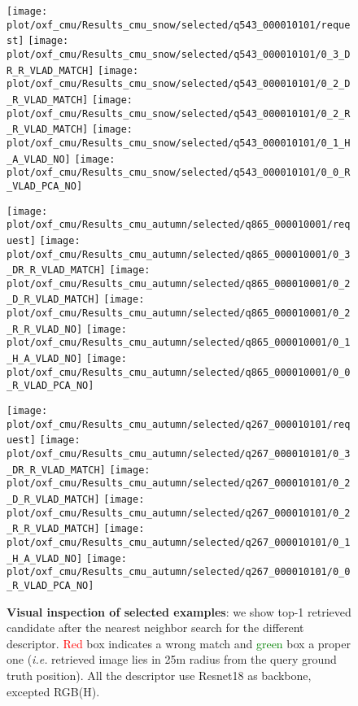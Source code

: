 \begin{figure*}
\begin{minipage}{0.95\textwidth}
		\texttt{[image: plot/oxf\_cmu/Results\_cmu\_snow/selected/q543\_000010101/request]}
		\texttt{[image: plot/oxf\_cmu/Results\_cmu\_snow/selected/q543\_000010101/0\_3\_DR\_R\_VLAD\_MATCH]}
		\texttt{[image: plot/oxf\_cmu/Results\_cmu\_snow/selected/q543\_000010101/0\_2\_D\_R\_VLAD\_MATCH]}
		\texttt{[image: plot/oxf\_cmu/Results\_cmu\_snow/selected/q543\_000010101/0\_2\_R\_R\_VLAD\_MATCH]}
		\texttt{[image: plot/oxf\_cmu/Results\_cmu\_snow/selected/q543\_000010101/0\_1\_H\_A\_VLAD\_NO]}
		\texttt{[image: plot/oxf\_cmu/Results\_cmu\_snow/selected/q543\_000010101/0\_0\_R\_VLAD\_PCA\_NO]}
	\end{minipage}
	
	\begin{minipage}{0.01\textwidth}
	\end{minipage}
	\begin{minipage}{0.95\textwidth}
		\center
		\texttt{[image: plot/oxf\_cmu/Results\_cmu\_autumn/selected/q865\_000010001/request]}
		\texttt{[image: plot/oxf\_cmu/Results\_cmu\_autumn/selected/q865\_000010001/0\_3\_DR\_R\_VLAD\_MATCH]}
		\texttt{[image: plot/oxf\_cmu/Results\_cmu\_autumn/selected/q865\_000010001/0\_2\_D\_R\_VLAD\_MATCH]}	
		\texttt{[image: plot/oxf\_cmu/Results\_cmu\_autumn/selected/q865\_000010001/0\_2\_R\_R\_VLAD\_NO]}	
		\texttt{[image: plot/oxf\_cmu/Results\_cmu\_autumn/selected/q865\_000010001/0\_1\_H\_A\_VLAD\_NO]}	
		\texttt{[image: plot/oxf\_cmu/Results\_cmu\_autumn/selected/q865\_000010001/0\_0\_R\_VLAD\_PCA\_NO]}
		
		\texttt{[image: plot/oxf\_cmu/Results\_cmu\_autumn/selected/q267\_000010101/request]}
		\texttt{[image: plot/oxf\_cmu/Results\_cmu\_autumn/selected/q267\_000010101/0\_3\_DR\_R\_VLAD\_MATCH]}
		\texttt{[image: plot/oxf\_cmu/Results\_cmu\_autumn/selected/q267\_000010101/0\_2\_D\_R\_VLAD\_MATCH]}
		\texttt{[image: plot/oxf\_cmu/Results\_cmu\_autumn/selected/q267\_000010101/0\_2\_R\_R\_VLAD\_MATCH]}
		\texttt{[image: plot/oxf\_cmu/Results\_cmu\_autumn/selected/q267\_000010101/0\_1\_H\_A\_VLAD\_NO]}
		\texttt{[image: plot/oxf\_cmu/Results\_cmu\_autumn/selected/q267\_000010101/0\_0\_R\_VLAD\_PCA\_NO]}
	\end{minipage}
	
	\caption{\label{fig:im_exs} \textbf{Visual inspection of selected examples}: we show top-1 retrieved candidate after the nearest neighbor search for the different descriptor. \textcolor{red}{Red} box indicates a wrong match and \textcolor{green}{green} box a proper one (\textit{i.e.} retrieved image lies in 25m radius from the query ground truth position). All the descriptor use Resnet18 as backbone, excepted RGB(H).}
\end{figure*}